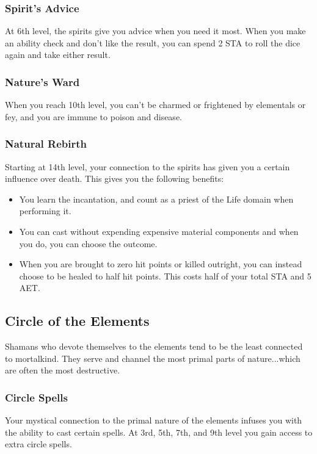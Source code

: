 \subsubsection{Spirit's Advice}
At 6th level, the spirits give you advice when you need it most. When you make an ability check and don't like the result, you can spend 2 STA to roll the dice again and take either result.

\subsubsection{Nature's Ward}

When you reach 10th level, you can't be charmed or frightened by elementals or fey, and you are immune to poison and disease.

\subsubsection{Natural Rebirth}
Starting at 14th level, your connection to the spirits has given you a certain influence over death. This gives you the following benefits:
\begin{itemize}
  \item You learn the  incantation, and count as a priest of the Life domain when performing it.
  \item You can cast  without expending expensive material components and when you do, you can choose the outcome.
  \item When you are brought to zero hit points or killed outright, you can instead choose to be healed to half hit points. This costs half of your total STA and 5 AET.
\end{itemize}

\subsection{Circle of the Elements}
Shamans who devote themselves to the elements tend to be the least connected to mortalkind. They serve and channel the most primal parts of nature...which are often the most destructive.

\subsubsection{Circle Spells}

Your mystical connection to the primal nature of the elements infuses you with the ability to cast certain spells. At 3rd, 5th, 7th, and 9th level you gain access to extra circle spells.

